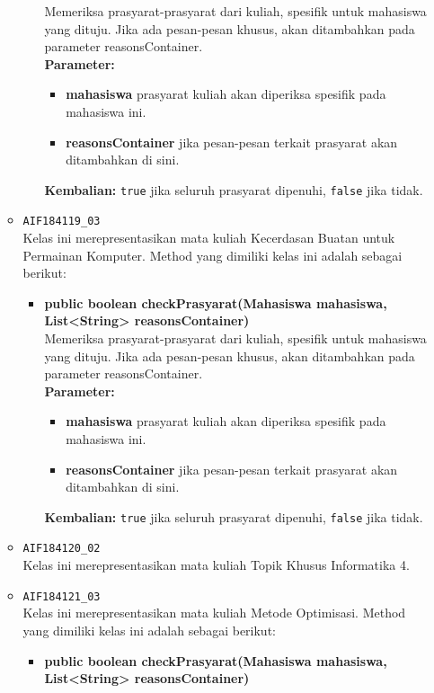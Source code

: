 \begin{enumerate}
\begin{itemize}
\begin{itemize}
			Memeriksa prasyarat-prasyarat dari kuliah, spesifik untuk mahasiswa yang dituju. Jika ada pesan-pesan khusus, akan ditambahkan pada parameter reasonsContainer.\\
			\textbf{Parameter:}
			\begin{itemize}
				\item \textbf{mahasiswa} prasyarat kuliah akan diperiksa spesifik pada mahasiswa ini.
				\item \textbf{reasonsContainer} jika pesan-pesan terkait prasyarat akan ditambahkan di sini.
			\end{itemize}
			\textbf{Kembalian:} \texttt{true} jika seluruh prasyarat dipenuhi, \texttt{false} jika tidak.
		\end{itemize}
		\item \texttt{AIF184119\_03} \\
		Kelas ini merepresentasikan mata kuliah Kecerdasan Buatan untuk Permainan Komputer. Method yang dimiliki kelas ini adalah sebagai berikut: 
		\begin{itemize}
			\item \textbf{public boolean checkPrasyarat(Mahasiswa mahasiswa, List<String> reasonsContainer)}\\
			Memeriksa prasyarat-prasyarat dari kuliah, spesifik untuk mahasiswa yang dituju. Jika ada pesan-pesan khusus, akan ditambahkan pada parameter reasonsContainer.\\
			\textbf{Parameter:}
			\begin{itemize}
				\item \textbf{mahasiswa} prasyarat kuliah akan diperiksa spesifik pada mahasiswa ini.
				\item \textbf{reasonsContainer} jika pesan-pesan terkait prasyarat akan ditambahkan di sini.
			\end{itemize}
			\textbf{Kembalian:} \texttt{true} jika seluruh prasyarat dipenuhi, \texttt{false} jika tidak.
		\end{itemize}
		\item \texttt{AIF184120\_02} \\
		Kelas ini merepresentasikan mata kuliah Topik Khusus Informatika 4.
		\item \texttt{AIF184121\_03} \\
		Kelas ini merepresentasikan mata kuliah Metode Optimisasi. Method yang dimiliki kelas ini adalah sebagai berikut: 
		\begin{itemize}
			\item \textbf{public boolean checkPrasyarat(Mahasiswa mahasiswa, List<String> reasonsContainer)}\\

\end{itemize}
\end{itemize}
\end{enumerate}

